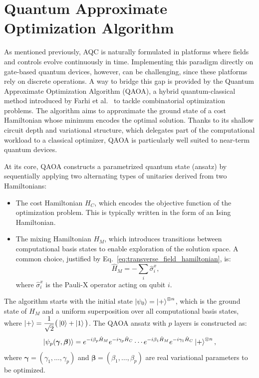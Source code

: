 \section{Quantum Approximate Optimization Algorithm}
\label{Section:QAOA}

As mentioned previously, AQC is naturally formulated in platforms where fields and controls evolve continuously in time. Implementing this paradigm directly on gate-based quantum devices, however, can be challenging, since these platforms rely on discrete operations. A way to bridge this gap is provided by the Quantum Approximate Optimization Algorithm (QAOA), a hybrid quantum-classical method introduced by Farhi et al.~\cite{farhi_quantum_2014} to tackle combinatorial optimization problems. The algorithm aims to approximate the ground state of a cost Hamiltonian whose minimum encodes the optimal solution. Thanks to its shallow circuit depth and variational structure, which delegates part of the computational workload to a classical optimizer, QAOA is particularly well suited to near-term quantum devices.

At its core, QAOA constructs a parametrized quantum state (ansatz) by sequentially applying two alternating types of unitaries derived from two Hamiltonians:
\begin{itemize}
    \item The cost Hamiltonian $H_C$, which encodes the objective function of the optimization
    problem. This is typically written in the form of an Ising Hamiltonian.
    \item The mixing Hamiltonian $H_M$, which introduces transitions between computational
    basis states to enable exploration of the solution space. A common choice, justified by Eq.~\eqref{eq:transverse_field_hamiltonian}, is:
    \begin{equation}
        \hat{H}_M = - \sum_i \hat{\sigma}_i^x,
        \label{eq:mixing_hamiltonian}
    \end{equation}
    where $\hat{\sigma}_i^x$ is the Pauli-X operator acting on qubit $i$.
\end{itemize}

The algorithm starts with the initial state $\ket{\psi_0} = \ket{+}^{\otimes n}$, which is the ground state of $H_M$ and a uniform superposition over all computational basis states, where $\ket{+} = \dfrac{1}{\sqrt{2}} \big(\ket{0} + \ket{1}\big)$. The QAOA ansatz with $p$ layers is constructed as:
\begin{equation}
    \ket{\psi_p(\bm{\gamma}, \bm{\beta})} = e^{-i \beta_p \hat{H}_M} e^{- i \gamma_p \hat{H}_C} \cdots
    e^{-i \beta_1 \hat{H}_M} e^{- i \gamma_1 \hat{H}_C} \ket{+}^{\otimes n},
    \label{eq:qaoa_state_evolution}
\end{equation}
where $\bm{\gamma} = (\gamma_1, \dots, \gamma_p)$ and $\bm{\beta} = (\beta_1, \dots, \beta_p)$ are real variational parameters to be optimized.

